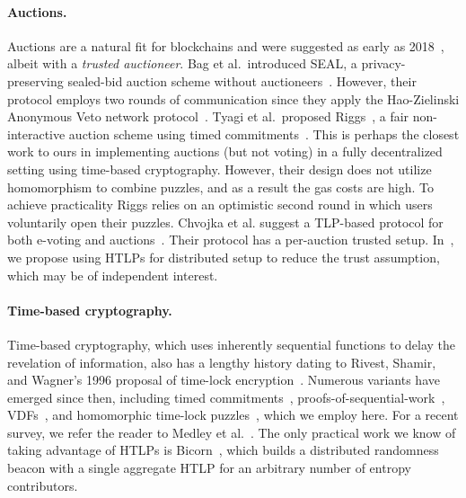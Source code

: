 \paragraph{Auctions.} 
Auctions are a natural fit for blockchains and were suggested as early as 2018~\cite{EPRINT:GalYou18}, albeit with a \emph{trusted auctioneer}. Bag et al.\ introduced SEAL, a privacy-preserving sealed-bid auction scheme without auctioneers~\cite{TIFS:BHSR19}. However, their protocol employs two rounds of communication since they apply the Hao-Zielinski Anonymous Veto network protocol~\cite{HaoZie06}. Tyagi et al.\ proposed Riggs~\cite{CCS:TAFWBM23}, a fair non-interactive auction scheme using timed commitments~\cite[\S6]{TCC:FKPS21}. This is perhaps the closest work to ours in implementing auctions (but not voting) in a fully decentralized setting using time-based cryptography. However, their design does not utilize homomorphism to combine puzzles, and as a result the gas costs are high. To achieve practicality Riggs relies on an optimistic second round in which users voluntarily open their puzzles. %
Chvojka et al. suggest a TLP-based protocol for both e-voting and auctions~\cite{ESORICS:CJSS21}. Their protocol has a per-auction trusted setup. In~, we propose using HTLPs for distributed setup to reduce the trust assumption, which may be of independent interest.

\paragraph{Time-based cryptography.} 
Time-based cryptography, which uses inherently sequential functions to delay the revelation of information, also has a lengthy history dating to Rivest, Shamir, and Wagner's 1996 proposal of time-lock encryption~\cite{RivShaWag96}.
Numerous variants have emerged since then, including timed commitments~\cite{C:BonNao00}, proofs-of-sequential-work~\cite{ITCS:MahMorVad13}, VDFs~\cite{C:BBBF18}, and homomorphic time-lock puzzles~\cite{C:MalThy19}, which we employ here.
For a recent survey, we refer the reader to Medley et al.~\cite{CSF:MedLoeQua23}. The only practical work we know of taking advantage of HTLPs is Bicorn~\cite{FC:CATB23}, which builds a distributed randomness beacon with a single aggregate HTLP for an arbitrary number of entropy contributors.

